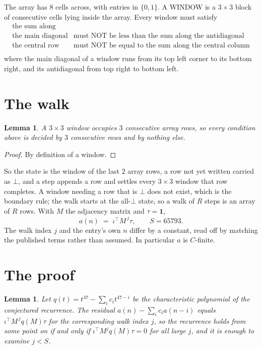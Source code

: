 \documentclass[11pt,a4paper]{article}
\theoremstyle{plain}
\newtheorem{lemma}[theorem]{Lemma}
\theoremstyle{definition}
\begin{document}
The array has $8$ cells across, with entries in $\{0,1\}$. A WINDOW is a $3\times3$ block
of consecutive cells lying inside the array. Every window must satisfy
\[
\begin{array}{ll}
\text{the sum along} & \text{} \\[2pt]
\text{the main diagonal} & \text{must NOT be less than the sum along the antidiagonal} \\
\text{the central row} & \text{must NOT be equal to the sum along the central column} \\
\end{array}
\]
where the main diagonal of a window runs from its top left corner to its bottom right, and its
antidiagonal from top right to bottom left.

\section{The walk}

\begin{lemma}\label{lem:win}
A $3\times3$ window occupies $3$ consecutive array rows, so every condition above is
decided by $3$ consecutive rows and by nothing else.
\end{lemma}

\begin{proof}
By definition of a window.
\end{proof}

So the state is the window of the last $2$ array rows, a row not yet written carried as
$\bot$, and a step appends a row and settles every $3\times3$ window that row completes. A
window needing a row that is $\bot$ does not exist, which is the boundary rule; the walk starts
at the all-$\bot$ state, so a walk of $R$ steps is an array of $R$ rows. With $M$ the adjacency
matrix and $\tau=\mathbf{1}$,
\[
a(n)\;=\;\iota^{\!\top}M^{\,j}\tau ,\qquad S=65793.
\]
The walk index $j$ and the entry's own $n$ differ by a constant, read off by matching the
published terms rather than assumed. In particular $a$ is $C$-finite.

\section{The proof}

\begin{lemma}\label{lem:crit}
Let $q(t)=t^{47}-\sum_i c_it^{47-i}$ be the characteristic polynomial of the
conjectured recurrence. The residual $a(n)-\sum_ic_ia(n-i)$ equals
$\iota^{\!\top}M^{\,j}q(M)\tau$ for the corresponding walk index $j$, so the recurrence
holds from some point on if and only if $\iota^{\!\top}M^{j}q(M)\tau=0$ for all large $j$,
and it is enough to examine $j<S$.
\end{lemma}
\end{document}
